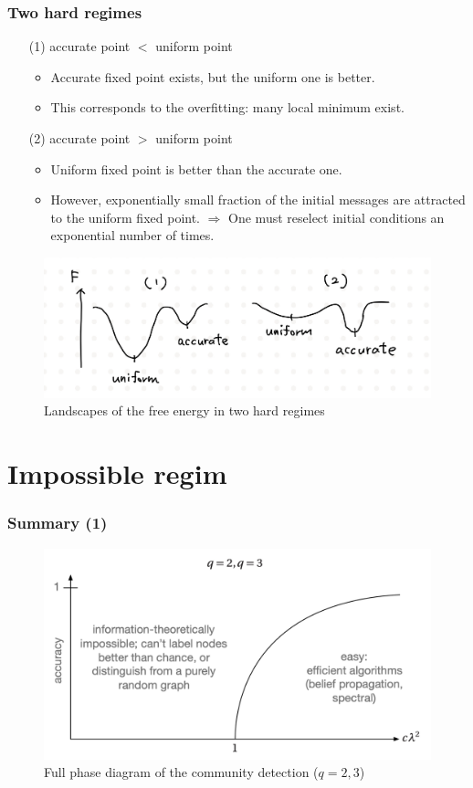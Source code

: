 \documentclass[dvipdfmx,11pt]{beamer}
\begin{document}
\begin{frame}
  \frametitle{Two hard regimes}
  \begin{itemize}
    \item[(1)] accurate point $<$ uniform point
    \begin{itemize}
      \item Accurate fixed point exists, but the uniform one is better.
      \item This corresponds to the \alert{overfitting}: many local minimum exist.
    \end{itemize}
    \item[(2)] accurate point $>$ uniform point
    \begin{itemize}
      \item Uniform fixed point is better than the accurate one.
      \item However, exponentially small fraction of the initial messages are attracted to the uniform fixed point.
      $\Rightarrow$ One must reselect initial conditions an exponential number of times.
    \end{itemize}
  \end{itemize}

  \begin{figure}
    \centering
    \includegraphics[width=0.7\linewidth]{figure/F.jpeg}
    \caption{Landscapes of the free energy in two hard regimes}
  \end{figure}
\end{frame}

\section{Impossible regim}
\begin{frame}
  \frametitle{Summary (1)}
  \begin{figure}
    \centering
    \includegraphics[width=0.9\linewidth]{figure/phase_s1.png}
    \caption{Full phase diagram of the community detection ($q = 2, 3$)}
  \end{figure}
\end{frame}
\end{document}
